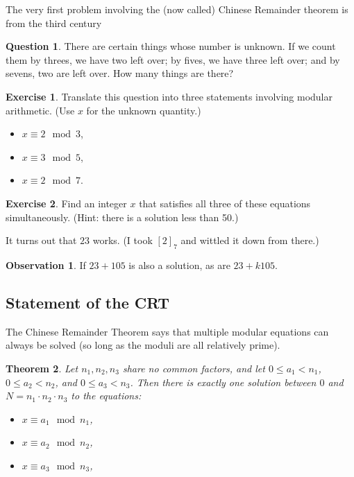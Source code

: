 \documentclass[11pt]{article}
\newtheorem{thm}{Theorem}
\theoremstyle{definition}
\newtheorem{exercise}{Exercise}
\newtheorem{question}[thm]{Question}
\newtheorem{observation}{Observation}
\numberwithin{thm}{section}
\begin{document}
The very first problem involving the (now called) Chinese Remainder theorem is from the third century

\begin{question} There are certain things whose number is unknown. If we count them by threes, we have two left over; by fives, we have three left over; and by sevens, two are left over. How many things are there?
\end{question}

\begin{exercise} Translate this question into three statements involving modular arithmetic. (Use $x$ for the unknown quantity.)
\end{exercise}

\begin{itemize}
	\item $x \equiv 2 \mod 3$,
    \item $x \equiv 3 \mod 5$,
    \item $x \equiv 2 \mod 7$.
\end{itemize}

\begin{exercise} Find an integer $x$ that satisfies all three of these equations simultaneously. (Hint: there is a solution less than 50.)
\end{exercise}

It turns out that $23$ works. (I took $[2]_7$ and wittled it down from there.)

\begin{observation} If $23 + 105$ is also a solution, as are $23 + k105$.
\end{observation}

\subsection{Statement of the CRT}

The Chinese Remainder Theorem says that multiple modular equations can always be solved (so long as the moduli are all relatively prime).

\begin{thm} Let $n_1, n_2, n_3$ share no common factors, and let $0\leq a_1 < n_1$, $0 \leq a_2 < n_2$, and $0 \leq a_3 < n_3$. Then there is exactly one solution between $0$ and $N = n_1 \cdot n_2 \cdot n_3$ to the equations: 
\begin{itemize}
	\item $x \equiv a_1 \mod n_1$,
    \item $x \equiv a_2 \mod n_2$,
    \item $x \equiv a_3 \mod n_3$,
\end{itemize}
\end{thm}
\end{document}
